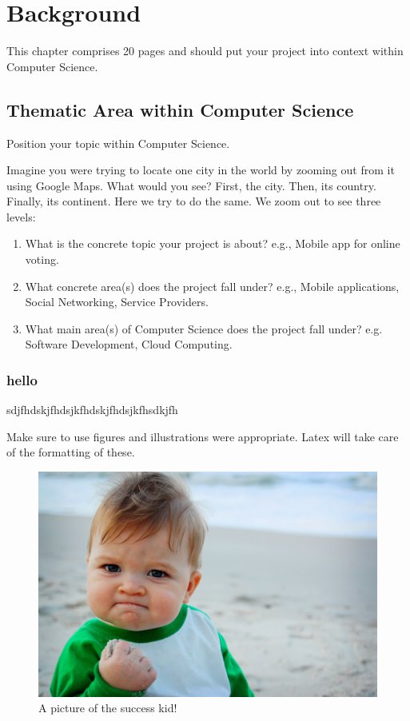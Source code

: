 \chapter{Background}
This chapter comprises 20 pages and should put your project into context within Computer Science.

\section{Thematic Area within Computer Science}
Position your topic within Computer Science. 

Imagine you were trying to locate one city in the world by zooming out from it using Google Maps. What would you see? First, the city. Then, its country. Finally, its continent. Here we try to do the same. We zoom out to see three levels:

\begin{enumerate}
    \item What is the concrete topic your project is about? e.g., Mobile app for online voting.
    \item What concrete area(s) does the project fall under? e.g., Mobile applications, Social Networking, Service Providers. 
    \item What main area(s) of Computer Science does the project fall under? e.g. Software Development, Cloud Computing.
\end{enumerate}

\subsection{hello}
sdjfhdskjfhdsjkfhdskjfhdsjkfhsdkjfh


Make sure to use figures and illustrations were appropriate. Latex will take care of the formatting of these.

\begin{figure}[ht]
  \centering
      \includegraphics[width=\textwidth]{Figures/successkid.jpg}
  \caption[A picture of the success kid!]{A picture of the success kid!\cite{Reference1}}
  \label{fig:successkid}
\end{figure}

